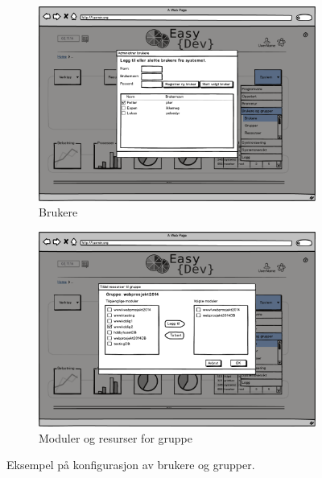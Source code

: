 \begin{figure}[h]
        \vspace{0.4cm}
        \begin{subfigure}[b]{0.48\textwidth}
                \includegraphics[width=\textwidth]
                {./img/prosessdokumentasjon/lowfi/b3.png}
                \caption{Brukere}
                \label{fig:brukere3}
        \end{subfigure}
        \hspace{0.02cm}
        \begin{subfigure}[b]{0.48\textwidth}
                \includegraphics[width=\textwidth]
                {./img/prosessdokumentasjon/lowfi/b4.png}
                \caption{Moduler og resurser for gruppe}
                \label{fig:brukere4}
        \end{subfigure}
        \vspace{0.1cm}
        \caption[Konfigurasjon av brukere og grupper]{Eksempel på konfigurasjon av brukere og grupper.}\label{fig:lowfibrukere}
\end{figure}
